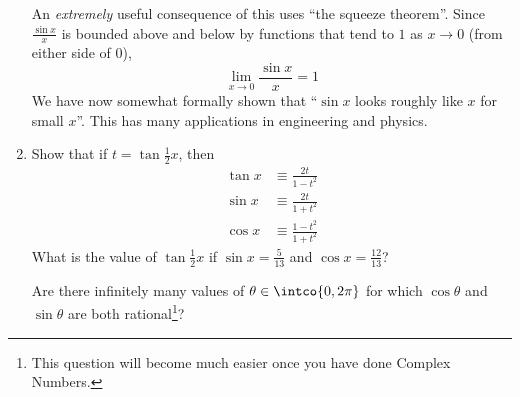 \begin{enumerate}
  An \emph{extremely} useful consequence of this uses ``the squeeze theorem''.
  Since \(\frac{\sin x} x\) is bounded above and below by functions that tend to
  \(1\) as \(x \to 0\) (from either side of \(0\)),
  \begin{equation*}
   \lim_{x \to 0} \frac{\sin x}x = 1
  \end{equation*}
  We have now somewhat formally shown that ``\(\sin x\) looks roughly like \(x\)
  for small \(x\)''. This has many applications in engineering and physics.
 \item \label{q_trig_weierstrass}
  Show that if \(t = \tan \frac 12 x\), then
  \begin{align*}
   \tan x &\equiv \frac{2t}{1 - t^2} \\
   \sin x &\equiv \frac{2t}{1 + t^2} \\
   \cos x &\equiv \frac{1 - t^2}{1 + t^2}
  \end{align*}
  What is the value of \(\tan \frac 12 x\) if \(\sin x = \frac 5{13}\) and
  \(\cos x = \frac{12}{13}\)?

  Are there infinitely many values of \(\theta \in \intco{0, 2\pi}\) for which
  \(\cos \theta\) and \(\sin \theta\) are both rational\footnote{
   This question will become much easier once you have done Complex Numbers.
  }?
\end{enumerate}
